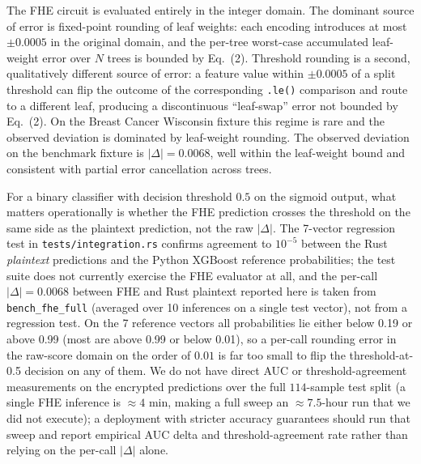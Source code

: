 \documentclass[12pt]{article}
\begin{document}
The FHE circuit is evaluated entirely in the integer domain. The dominant source of error is fixed-point rounding of leaf weights: each encoding introduces at most $\pm 0.0005$ in the original domain, and the per-tree worst-case accumulated leaf-weight error over $N$ trees is bounded by Eq.~(2). Threshold rounding is a second, qualitatively different source of error: a feature value within $\pm 0.0005$ of a split threshold can flip the outcome of the corresponding \texttt{.le()} comparison and route to a different leaf, producing a discontinuous ``leaf-swap'' error not bounded by Eq.~(2). On the Breast Cancer Wisconsin fixture this regime is rare and the observed deviation is dominated by leaf-weight rounding. The observed deviation on the benchmark fixture is $|\Delta| = 0.0068$, well within the leaf-weight bound and consistent with partial error cancellation across trees.

For a binary classifier with decision threshold $0.5$ on the sigmoid output, what matters operationally is whether the FHE prediction crosses the threshold on the same side as the plaintext prediction, not the raw $|\Delta|$. The 7-vector regression test in \texttt{tests/integration.rs} confirms agreement to $10^{-5}$ between the Rust \emph{plaintext} predictions and the Python XGBoost reference probabilities; the test suite does not currently exercise the FHE evaluator at all, and the per-call $|\Delta| = 0.0068$ between FHE and Rust plaintext reported here is taken from \texttt{bench\_fhe\_full} (averaged over 10 inferences on a single test vector), not from a regression test. On the 7 reference vectors all probabilities lie either below 0.19 or above 0.99 (most are above 0.99 or below 0.01), so a per-call rounding error in the raw-score domain on the order of $0.01$ is far too small to flip the threshold-at-0.5 decision on any of them. We do not have direct AUC or threshold-agreement measurements on the encrypted predictions over the full $114$-sample test split (a single FHE inference is $\approx 4$ min, making a full sweep an $\approx 7.5$-hour run that we did not execute); a deployment with stricter accuracy guarantees should run that sweep and report empirical AUC delta and threshold-agreement rate rather than relying on the per-call $|\Delta|$ alone.
\end{document}
